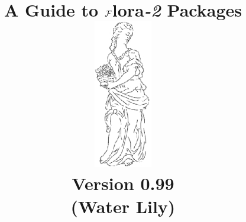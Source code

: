 \documentclass[11pt]{report}
\begin{document}
\newcommand{\FLORA}{{\mbox{\sc ${\cal F}${lora}\rm\emph{-2}}}\xspace}
\newcommand{\fl}{F-logic }

\newcommand{\fd}{{\mbox{\tt \,->\,}}}                   %
\newcommand{\bfd}{{\mbox{\tt \,*->\,}}}            %
\newcommand{\mvd}{{\mbox{\tt \,->\,}}}  %
\newcommand{\bmvd}{{\mbox{\tt \,*->\,}}}              %
\newcommand{\Fd}{{\mbox{\tt \,=>\,}}}                      %
\newcommand{\Mvd}{{\mbox{\tt \,=>\,}}}  %
\newcommand{\bFd}{{\mbox{\tt \,*=>\,}}}                      %
\newcommand{\bMvd}{{\mbox{\tt \,*=>\,}}}  %
\newcommand{\thismodule}{{\tt \_@}\xspace}

\def\Protege{Prot\'{e}g\'{e} }
\def\NoProtege{Prot\'{e}g\'{e}}

\title{\bf A Guide to \FLORA Packages
        \vspace{0.7cm}\\
 \includegraphics[width=1in]{floralogo} 
           \vspace{3mm}\\
       {\Large Version 0.99}
       \\
       {\large (Water Lily)}
}


\maketitle


\thispagestyle{empty}
\newpage
\thispagestyle{empty}

\tableofcontents
\newpage        %
  




\end{document}
